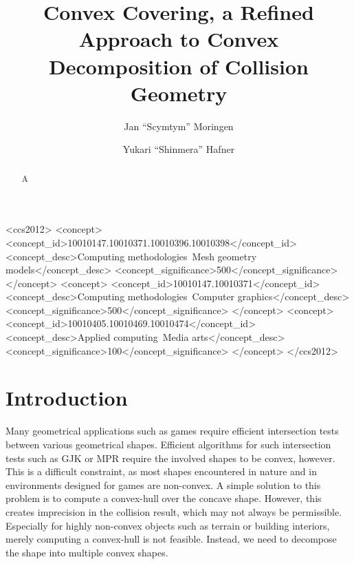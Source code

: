 \documentclass[format=sigconf]{acmart}
\begin{document}
\title{Convex Covering, a Refined Approach to Convex Decomposition of Collision Geometry}

\author{Jan ``Scymtym'' Moringen}
\author{Yukari ``Shinmera'' Hafner}

\begin{CCSXML}
  <ccs2012>
  <concept>
  <concept_id>10010147.10010371.10010396.10010398</concept_id>
  <concept_desc>Computing methodologies~Mesh geometry models</concept_desc>
  <concept_significance>500</concept_significance>
  </concept>
  <concept>
  <concept_id>10010147.10010371</concept_id>
  <concept_desc>Computing methodologies~Computer graphics</concept_desc>
  <concept_significance>500</concept_significance>
  </concept>
  <concept>
  <concept_id>10010405.10010469.10010474</concept_id>
  <concept_desc>Applied computing~Media arts</concept_desc>
  <concept_significance>100</concept_significance>
  </concept>
  </ccs2012>
\end{CCSXML}


\begin{abstract}
  A
\end{abstract}


\maketitle

\def\abovecaptionskip{1pt}
\def\listingautorefname{Listing}
\def\figureautorefname{Figure}

\section{Introduction}\label{introduction}
Many geometrical applications such as games require efficient intersection tests between various geometrical shapes. Efficient algorithms for such intersection tests such as GJK\cite{gilbert1988fast} or MPR\cite{snethen2008xenocollide} require the involved shapes to be convex, however. This is a difficult constraint, as most shapes encountered in nature and in environments designed for games are non-convex. A simple solution to this problem is to compute a convex-hull over the concave shape. However, this creates imprecision in the collision result, which may not always be permissible. Especially for highly non-convex objects such as terrain or building interiors, merely computing a convex-hull is not feasible.
Instead, we need to decompose the shape into multiple convex shapes.
\end{document}
